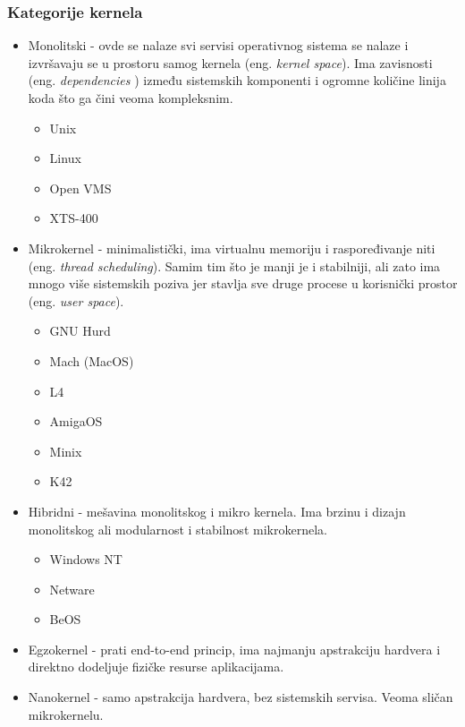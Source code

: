 \documentclass[a4paper,14pt]{article}
\begin{document}
\subsubsection{Kategorije kernela\cite{kernelcats}}
\begin{itemize}
\item Monolitski - ovde se nalaze svi servisi operativnog sistema se nalaze i izvršavaju se u prostoru samog kernela (eng. \textit{kernel space}). Ima zavisnosti (eng. \textit{dependencies} ) između sistemskih komponenti i ogromne količine linija koda što ga čini veoma kompleksnim.
\begin{itemize}
\item Unix
\item Linux
\item Open VMS
\item XTS-400
\end{itemize}
\item Mikrokernel - minimalistički, ima virtualnu memoriju i raspoređivanje niti (eng. \textit{thread scheduling}). Samim tim što je manji je i stabilniji, ali zato ima mnogo više sistemskih poziva jer stavlja sve druge procese u korisnički prostor (eng. \textit{user space}).
\begin{itemize}
\item GNU Hurd
\item Mach (MacOS)
\item L4
\item AmigaOS
\item Minix
\item K42
\end{itemize}
\item Hibridni - mešavina monolitskog i mikro kernela. Ima brzinu i dizajn monolitskog ali modularnost i stabilnost mikrokernela.
\begin{itemize}
\item Windows NT
\item Netware
\item BeOS
\end{itemize}
\item Egzokernel - prati end-to-end princip, ima najmanju apstrakciju hardvera i direktno dodeljuje fizičke resurse aplikacijama.
\item Nanokernel - samo apstrakcija hardvera, bez sistemskih servisa. Veoma sličan mikrokernelu.
\end{itemize}
\newpage
\end{document}
